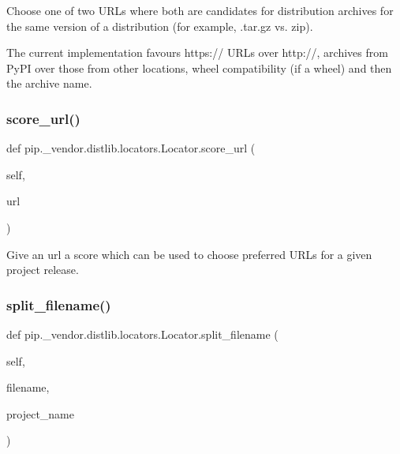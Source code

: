 \begin{DoxyVerb}Choose one of two URLs where both are candidates for distribution
archives for the same version of a distribution (for example,
.tar.gz vs. zip).

The current implementation favours https:// URLs over http://, archives
from PyPI over those from other locations, wheel compatibility (if a
wheel) and then the archive name.
\end{DoxyVerb}
 \mbox{\label{classpip_1_1__vendor_1_1distlib_1_1locators_1_1Locator_a3180e78cd0ef4792f1ddcde7866695f9}} 
\subsubsection{\texorpdfstring{score\+\_\+url()}{score\_url()}}
{\footnotesize\ttfamily def pip.\+\_\+vendor.\+distlib.\+locators.\+Locator.\+score\+\_\+url (\begin{DoxyParamCaption}\item[{}]{self,  }\item[{}]{url }\end{DoxyParamCaption})}

\begin{DoxyVerb}Give an url a score which can be used to choose preferred URLs
for a given project release.
\end{DoxyVerb}
 \mbox{\label{classpip_1_1__vendor_1_1distlib_1_1locators_1_1Locator_a8e68b5106f89d22f24a6cb8652099172}} 
\subsubsection{\texorpdfstring{split\+\_\+filename()}{split\_filename()}}
{\footnotesize\ttfamily def pip.\+\_\+vendor.\+distlib.\+locators.\+Locator.\+split\+\_\+filename (\begin{DoxyParamCaption}\item[{}]{self,  }\item[{}]{filename,  }\item[{}]{project\+\_\+name }\end{DoxyParamCaption})}


